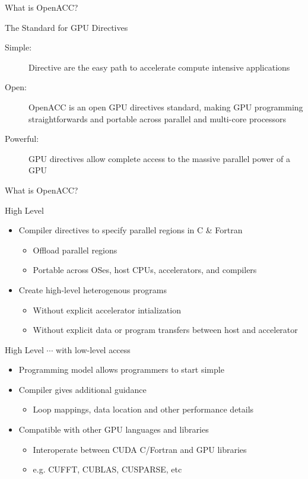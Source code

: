 \documentclass[10pt,t]{beamer}
\begin{document}
\begin{frame}[allowframebreaks]{What is OpenACC?}
  \begin{exampleblock}{The Standard for GPU Directives}
    \begin{description}
      \item[Simple:] Directive are the easy path to accelerate compute intensive applications
      \item[Open:] OpenACC is an open GPU directives standard, making GPU programming straightforwards and portable across parallel and multi-core processors
      \item[Powerful:] GPU directives allow complete access to the massive parallel power of a GPU
    \end{description}
  \end{exampleblock}
\end{frame}

\begin{frame}{What is OpenACC?}
  \vspace{-0.5cm}
  \begin{exampleblock}{High Level}
    \begin{itemize}
      \item Compiler directives to specify parallel regions in C \& Fortran
      \begin{itemize}
        \item Offload parallel regions
        \item Portable across OSes, host CPUs, accelerators, and compilers
      \end{itemize}
      \item Create high-level heterogenous programs
      \begin{itemize}
        \item Without explicit accelerator intialization
        \item Without explicit data or program transfers between host and accelerator
      \end{itemize}
    \end{itemize}
  \end{exampleblock}
  \begin{exampleblock}{High Level $\cdots$ with low-level access}
    \begin{itemize}
      \item Programming model allows programmers to start simple
      \item Compiler gives additional guidance
      \begin{itemize}
        \item Loop mappings, data location and other performance details
      \end{itemize}
      \item Compatible with other GPU languages and libraries
      \begin{itemize}
        \item Interoperate between CUDA C/Fortran and GPU libraries
        \item e.g. CUFFT, CUBLAS, CUSPARSE, etc
      \end{itemize}
    \end{itemize}
  \end{exampleblock}
\end{frame}
\end{document}
